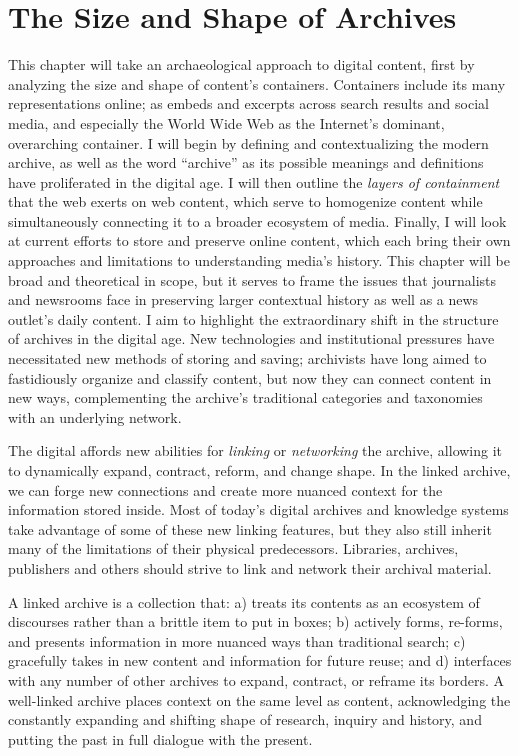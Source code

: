 \chapter{The Size and Shape of Archives}


This chapter will take an archaeological approach to digital content, first by analyzing the size and shape of content's containers. Containers include its many representations online; as embeds and excerpts across search results and social media, and especially the World Wide Web as the Internet's dominant, overarching container. I will begin by defining and contextualizing the modern archive, as well as the word ``archive'' as its possible meanings and definitions have proliferated in the digital age. I will then outline the \emph{layers of containment} that the web exerts on web content, which serve to homogenize content while simultaneously connecting it to a broader ecosystem of media. Finally, I will look at current efforts to store and preserve online content, which each bring their own approaches and limitations to understanding media's history. This chapter will be broad and theoretical in scope, but it serves to frame the issues that journalists and newsrooms face in preserving larger contextual history as well as a news outlet's daily content. I aim to highlight the extraordinary shift in the structure of archives in the digital age. New technologies and institutional pressures have necessitated new methods of storing and saving; archivists have long aimed to fastidiously organize and classify content, but now they can connect content in new ways, complementing the archive's traditional categories and taxonomies with an underlying network.

The digital affords new abilities for \emph{linking} or \emph{networking} the archive, allowing it to dynamically expand, contract, reform, and change shape. In the linked archive, we can forge new connections and create more nuanced context for the information stored inside. Most of today's digital archives and knowledge systems take advantage of some of these new linking features, but they also still inherit many of the limitations of their physical predecessors. Libraries, archives, publishers and others should strive to link and network their archival material.

A linked archive is a collection that: a) treats its contents as an ecosystem of discourses rather than a brittle item to put in boxes; b) actively forms, re-forms, and presents information in more nuanced ways than traditional search; c) gracefully takes in new content and information for future reuse; and d) interfaces with any number of other archives to expand, contract, or reframe its borders. A well-linked archive places context on the same level as content, acknowledging the constantly expanding and shifting shape of research, inquiry and history, and putting the past in full dialogue with the present.

